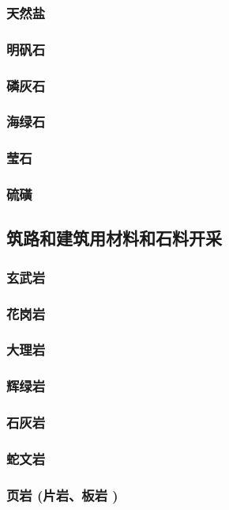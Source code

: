 \documentclass[UTF8]{../../ApplicationUniverse}
\begin{document}
        \subsubsection{天然盐}
        \subsubsection{明矾石}
        \subsubsection{磷灰石}
        \subsubsection{海绿石}
        \subsubsection{莹石}
        \subsubsection{硫磺}
    \subsection{筑路和建筑用材料和石料开采}
        \subsubsection{玄武岩}
        \subsubsection{花岗岩}
        \subsubsection{大理岩}
        \subsubsection{辉绿岩}
        \subsubsection{石灰岩}
        \subsubsection{蛇文岩}
        \subsubsection{页岩 (片岩、板岩 )}
\end{document}
